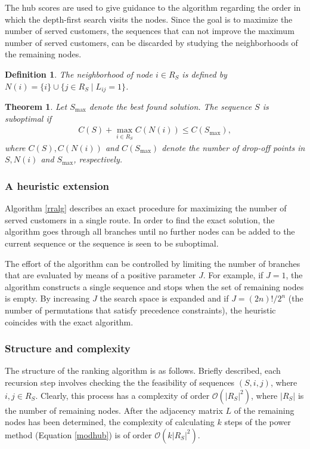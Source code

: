 \documentclass[dissertation,draft*]{aaltoseries}
\newtheorem{theorem}{Theorem}
\newtheorem*{definition}{Definition}
\begin{document}
The hub scores are used to give guidance to the algorithm regarding the order in which the 
depth-first search visits the nodes. 
Since the goal is to maximize the number of served customers, the sequences that can not improve the maximum 
number of served customers, can be discarded by studying the neighborhoods of the remaining nodes. 
\begin{definition}
 The neighborhood of node $i \in R_S$ is defined by $N(i) = \{i\} \cup \{j \in R_S \mid L_{ij} = 1\}$.
\end{definition}
\begin{theorem}
Let $S_{\max}$ denote the best found solution.
The sequence $S$ is suboptimal if 
\begin{align*}
C(S) + \max_{i \in R_S} C(N(i)) \leq C(S_{\max}),
\end{align*}
where $C(S), C(N(i))$ and $C(S_{\max})$ denote the number of drop-off points in $S,N(i)$ and $S_{\max}$,
respectively. 
\end{theorem}


\subsubsection{A heuristic extension}
\label{rrheuristic}
Algorithm \ref{rralg} describes an exact procedure for maximizing the number of served customers
in a single route. In order to find the exact solution, the algorithm goes through all
branches until no further nodes can be added to the current sequence or the sequence is seen to be suboptimal.

The effort of the algorithm can be controlled by limiting the number of branches that are evaluated
by means of a positive parameter $J$. For example, if $J=1$, the algorithm constructs a single sequence
and stops when the set of remaining nodes is empty. By increasing $J$ the search space is expanded and
if $J = (2n)!/2^n$ (the number of permutations that satisfy precedence constraints), the heuristic
coincides with the exact algorithm.


\subsubsection{Structure and complexity}
\label{rrstructure}
The structure of the ranking algorithm is as follows. 
Briefly described, each recursion step involves checking the the feasibility
of sequences $(S,i,j)$, where $i,j \in R_S$.
Clearly, this process has a complexity of order $\mathcal{O} (|R_S|^2)$,
where $|R_S|$ is the number of remaining nodes. 
After the adjacency matrix $L$ of the remaining nodes has been determined, the complexity of 
calculating $k$ steps of the power method (Equation \eqref{modhub}) is of order $\mathcal{O} (k |R_S|^2)$.
\end{document}
